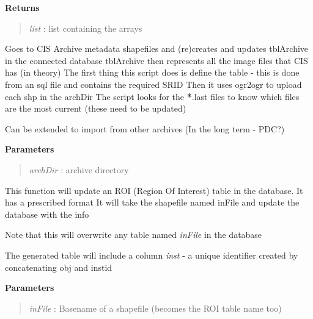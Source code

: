 \documentclass[letterpaper,10pt,openany,oneside]{sphinxmanual}
\begin{document}
\begin{fulllineitems}
\begin{fulllineitems}
\textbf{Returns}
\begin{quote}

\emph{list}     : list containing the arrays
\end{quote}

\end{fulllineitems}


\begin{fulllineitems}
\label{code:Database.Database.updateFromArchive}
Goes to CIS Archive metadata shapefiles and (re)creates and updates tblArchive in the connected database
tblArchive then represents all the image files that CIS has (in theory)
The first thing this script does is define the table - this is done from an sql file and contains the required SRID
Then it uses ogr2ogr to upload each shp in the archDir 
The script looks for the {\color{red}\bfseries{}*}.last files to know which files are the most current (these need to be updated)

Can be extended to import from other archives (In the long term - PDC?)

\textbf{Parameters}
\begin{quote}

\emph{archDir} : archive directory
\end{quote}

\end{fulllineitems}


\begin{fulllineitems}
\label{code:Database.Database.updateROI}
This function will update an ROI (Region Of Interest) table in the database. It has a prescribed format
It will take the shapefile named inFile and update the database with the info

Note that this will overwrite any table named \emph{inFile} in the database

The generated table will include a column \emph{inst} - a unique identifier created by 
concatenating obj and instid

\textbf{Parameters}
\begin{quote}

\emph{inFile}   : Basename of a shapefile (becomes the ROI table name too)


\end{quote}
\end{fulllineitems}
\end{fulllineitems}
\end{document}
